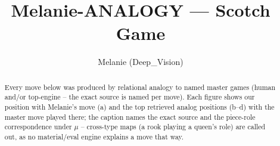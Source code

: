 \documentclass[11pt]{article}
\title{Melanie-ANALOGY — Scotch Game}
\author{Melanie (Deep\_Vision)}
\date{}
\begin{document}
\maketitle

\begin{abstract}Every move below was produced by relational analogy to named master games (human and/or top-engine -- the exact source is named per move). Each figure shows our position with Melanie's move (a) and the top retrieved analog positions (b--d) with the master move played there; the caption names the exact source and the piece-role correspondence under $\mu$ -- cross-type maps (a rook playing a queen's role) are called out, as no material/eval engine explains a move that way.\end{abstract}

\begin{figure}[p]\centering
\begin{subfigure}{0.46\textwidth}\centering
\resizebox{\linewidth}{!}{%
\newchessgame
\chessboard[
  setfen={r1b1kb1r/p1ppqppp/2p2n2/4P3/8/8/PPP2PPP/RNBQKB1R w KQkq - 1 7},
  showmover=false,
  pgfstyle=straightmove, color=movearrow, markmove={d1-e2}
]}
\caption{}
\end{subfigure}\hfill
\begin{subfigure}{0.46\textwidth}\centering
\resizebox{\linewidth}{!}{%
\newchessgame
\chessboard[
  setfen={r1b1kb1r/p1ppqppp/2p2n2/4P3/8/8/PPP2PPP/RNBQKB1R w KQkq - 1 7},
  showmover=false,
  pgfstyle=straightmove, color=movearrow, markmove={d1-e2}
]}
\caption{}
\end{subfigure}
\\[4pt]
\begin{subfigure}{0.46\textwidth}\centering
\resizebox{\linewidth}{!}{%
\newchessgame
\chessboard[
  setfen={r1b1kb1r/p1ppqppp/2p2n2/4P3/8/8/PPP2PPP/RNBQKB1R w KQkq - 1 7},
  showmover=false,
  pgfstyle=straightmove, color=movearrow, markmove={d1-e2}
]}
\caption{}
\end{subfigure}\hfill
\begin{subfigure}{0.46\textwidth}\centering
\resizebox{\linewidth}{!}{%
\newchessgame
\chessboard[
  setfen={r1b1kb1r/p1ppqppp/2p2n2/4P3/8/8/PPP2PPP/RNBQKB1R w KQkq - 1 7},
  showmover=false,
  pgfstyle=straightmove, color=movearrow, markmove={d1-e2}
]}
\caption{}
\end{subfigure}

\end{figure}
\end{document}
